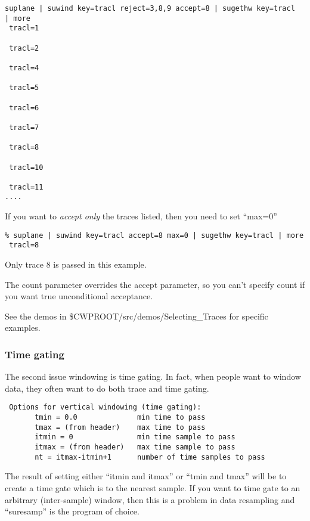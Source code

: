 {{{{{{{{\small \begin{verbatim}
suplane | suwind key=tracl reject=3,8,9 accept=8 | sugethw key=tracl
| more
 tracl=1

 tracl=2

 tracl=4

 tracl=5

 tracl=6

 tracl=7

 tracl=8

 tracl=10

 tracl=11   
....
\end{verbatim} } \noindent

If you want to {\em accept only \/} the traces listed, then you
need to set ``max=0''

{\small \begin{verbatim}
% suplane | suwind key=tracl accept=8 max=0 | sugethw key=tracl | more
 tracl=8 
\end{verbatim} } \noindent
Only trace 8 is passed in this example.

The count parameter overrides the accept    
parameter, so you can't specify count if you want true          
unconditional acceptance.

See the demos in \$CWPROOT/src/demos/Selecting\_Traces for specific
examples.

\subsubsection{Time gating}

The second issue windowing is time gating.
In fact, when people want to window data, they often want to
do both trace and time gating.
{\small \begin{verbatim}
 Options for vertical windowing (time gating):                         
       tmin = 0.0              min time to pass                        
       tmax = (from header)    max time to pass                        
       itmin = 0               min time sample to pass                 
       itmax = (from header)   max time sample to pass                 
       nt = itmax-itmin+1      number of time samples to pass          
\end{verbatim}} \noindent
The result of setting either ``itmin and itmax'' or ``tmin
and tmax'' will be to create a time gate which is to the
nearest sample. If you want to time gate to an arbitrary
(inter-sample) window, then this is a problem in data resampling
and ``suresamp'' is the program of choice.

}}}}}}}
